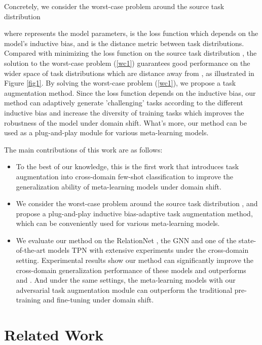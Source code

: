 \documentclass{article}
\begin{document}
Concretely, we consider the worst-case problem around the source task distribution 

where  represents the model parameters,  is the loss function which depends on the model's inductive bias, and  is the distance metric between task distributions. Compared with minimizing the loss function on the source task distribution , the solution to the worst-case problem (\ref{wc1}) guarantees good performance on the wider space of task distributions which are  distance away from , as illustrated in Figure \ref{fig1}. By solving the worst-case problem (\ref{wc1}), we propose a task augmentation method. Since the loss function depends on the inductive bias, our method can adaptively generate 'challenging' tasks according to the different inductive bias and increase the diversity of training tasks which improves the robustness of the model under domain shift. What's more, our method can be used as a plug-and-play module for various meta-learning models.

The main contributions of this work are as follows:
\begin{itemize}
\item To the best of our knowledge, this is the first work that introduces task augmentation into cross-domain few-shot classification to improve the generalization ability of meta-learning models under domain shift.
\item We consider the worst-case problem around the source task distribution , and propose a plug-and-play inductive bias-adaptive task augmentation method, which can be conveniently used for various meta-learning models.
\item We evaluate our method on the RelationNet \cite{sung2018learning}, the GNN \cite{garcia2018few} and one of the state-of-the-art models TPN \cite{liu2019learning} with extensive experiments under the cross-domain setting. Experimental results show our method can significantly improve the cross-domain generalization performance of these models and outperforms \cite{DBLP:conf/iclr/TsengLH020} and \cite{sun2020explanation}. And under the same settings, the meta-learning models with our adversarial task augmentation module can outperform the traditional pre-training and fine-tuning under domain shift.
\end{itemize}

\section{Related Work}
\end{document}
